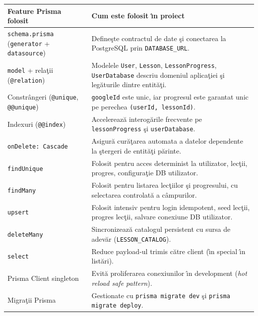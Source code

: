 \documentclass[12pt,onecolumn,draftclsnofoot]{IEEEtran}
\begin{document}
\begin{longtable}{p{} p{}}
\toprule
\textbf{Feature Prisma folosit} & \textbf{Cum este folosit \^{\i}n proiect} \\
\midrule
\texttt{schema.prisma} (\texttt{generator} + \texttt{datasource}) &
Define\c{s}te contractul de date \c{s}i conectarea la PostgreSQL prin \texttt{DATABASE\_URL}. \\
\texttt{model} + rela\c{t}ii (\texttt{@relation}) &
Modelele \texttt{User}, \texttt{Lesson}, \texttt{LessonProgress}, \texttt{UserDatabase} descriu domeniul aplica\c{t}iei \c{s}i leg\u{a}turile dintre entit\u{a}\c{t}i. \\
Constr\^{a}ngeri (\texttt{@unique}, \texttt{@@unique}) &
\texttt{googleId} este unic, iar progresul este garantat unic pe perechea \texttt{(userId, lessonId)}. \\
Indexuri (\texttt{@@index}) &
Accelereaz\u{a} interog\u{a}rile frecvente pe \texttt{lessonProgress} \c{s}i \texttt{userDatabase}. \\
\texttt{onDelete: Cascade} &
Asigur\u{a} cur\u{a}\c{t}area automata a datelor dependente la \c{s}tergeri de entit\u{a}\c{t}i p\u{a}rinte. \\
\texttt{findUnique} &
Folosit pentru acces determinist la utilizator, lec\c{t}ii, progres, configura\c{t}ie DB utilizator. \\
\texttt{findMany} &
Folosit pentru listarea lec\c{t}iilor \c{s}i progresului, cu selectarea controlat\u{a} a c\^{a}mpurilor. \\
\texttt{upsert} &
Folosit intensiv pentru login idempotent, seed lec\c{t}ii, progres lec\c{t}ii, salvare conexiune DB utilizator. \\
\texttt{deleteMany} &
Sincronizeaz\u{a} catalogul persistent cu sursa de adev\u{a}r (\texttt{LESSON\_CATALOG}). \\
\texttt{select} &
Reduce payload-ul trimis c\u{a}tre client (\^{\i}n special \^{\i}n list\u{a}ri). \\
Prisma Client singleton &
Evit\u{a} proliferarea conexiunilor \^{\i}n development (\emph{hot reload safe pattern}). \\
Migra\c{t}ii Prisma &
Gestionate cu \texttt{prisma migrate dev} \c{s}i \texttt{prisma migrate deploy}. \\
\bottomrule
\end{longtable}
\end{document}
